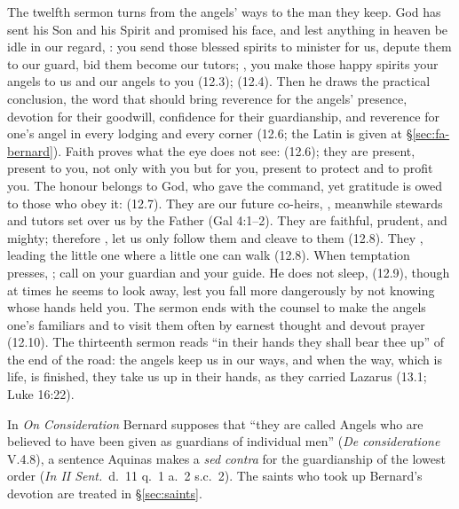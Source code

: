 The twelfth sermon turns from the angels' ways to the man they keep. God has
sent his Son and his Spirit and promised his face, and lest anything in
heaven be idle in our regard, :
you send those blessed spirits to minister for us, depute them to our
guard, bid them become our tutors; , you make those happy
spirits your angels to us and our angels to you (12.3);  (12.4). Then he draws the practical conclusion, the word that should
bring reverence for the angels' presence, devotion for their goodwill,
confidence for their guardianship, and reverence for one's angel in every
lodging and every corner (12.6; the Latin is given at
\S\ref{sec:fa-bernard}). Faith proves what the eye does not see:
 (12.6); they are present, present to
you, not only with you but for you, present to protect and to profit you.
The honour belongs to God, who gave the command, yet gratitude is owed to
those who obey it:  (12.7). They are our future
co-heirs, , meanwhile stewards and tutors set over us by the Father
(Gal 4:1--2). They are faithful, prudent, and mighty; therefore
, let us only follow them and
cleave to them (12.8). They , leading the little one where a little one can walk
(12.8). When temptation presses, ; call on your guardian and your guide. He does not
sleep,  (12.9), though at times
he seems to look away, lest you fall more dangerously by not knowing whose
hands held you. The sermon ends with the counsel to make the angels one's familiars and
to visit them often by earnest thought and devout prayer (12.10). The
thirteenth sermon
reads ``in their hands they shall bear thee up'' of the end of the road: the
angels keep us in our ways, and when the way, which is life, is finished,
they take us up in their hands, as they carried Lazarus (13.1; Luke 16:22).

In \emph{On Consideration} Bernard supposes that ``they are called Angels who
are believed to have been given as guardians of individual men''
(\emph{De consideratione} V.4.8), a sentence Aquinas makes a \emph{sed
contra} for the guardianship of the lowest order (\emph{In II Sent.}\ d.~11
q.~1 a.~2 s.c.~2). The saints who took up Bernard's devotion are treated in
\S\ref{sec:saints}.

